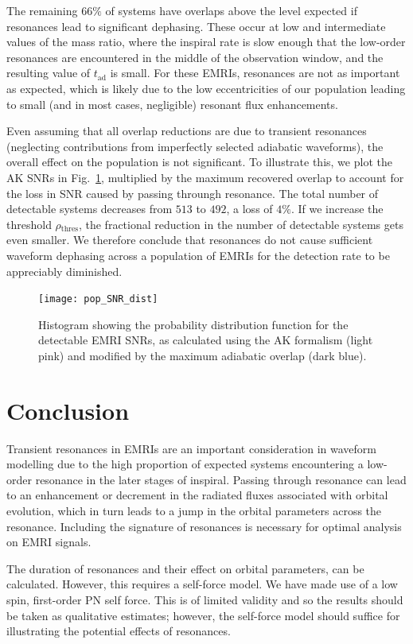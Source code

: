 \documentclass[aps,prd,amsfonts,amssymb,amsmath,nofootinbib,showpacs,superscriptaddress,twocolumn,floatfix]{revtex4-1}
\newcommand{\figref}[1]{Fig.~\ref{fig:#1}}
\newcommand{\sub}[1]{\ensuremath{_\mathrm{#1}}}
\begin{document}
The remaining $66\%$ of systems have overlaps above the level expected if resonances lead to significant dephasing. These occur at low and intermediate values of the mass ratio, where the inspiral rate is slow enough that the low-order resonances are encountered in the middle of the observation window, and the resulting value of $t\sub{ad}$ is small. For these EMRIs, resonances are not as important as expected, which is likely due to the low eccentricities of our population leading to small (and in most cases, negligible) resonant flux enhancements.

Even assuming that all overlap reductions are due to transient resonances (neglecting contributions from imperfectly selected adiabatic waveforms), the overall effect on the population is not significant. To illustrate this, we plot the AK SNRs in \figref{pop-SNR-dist}, multiplied by the maximum recovered overlap to account for the loss in SNR caused by passing throungh resonance. The total number of detectable systems decreases from $513$ to $492$, a loss of $4\%$. If we increase the threshold $\rho\sub{thres}$, the fractional reduction in the number of detectable systems gets even smaller. We therefore conclude that resonances do not cause sufficient waveform dephasing across a population of EMRIs for the detection rate to be appreciably diminished.

\begin{figure}
\centering
\texttt{[image: pop\_SNR\_dist]}
\caption{\label{fig:pop-SNR-dist}Histogram showing the probability distribution function for the detectable EMRI SNRs, as calculated using the AK formalism (light pink) and modified by the maximum adiabatic overlap (dark blue).}
\end{figure}

\section{Conclusion}
\label{sec:conclusion}

Transient resonances in EMRIs are an important consideration in waveform modelling due to the high proportion of expected systems encountering a low-order resonance in the later stages of inspiral. Passing through resonance can lead to an enhancement or decrement in the radiated fluxes associated with orbital evolution, which in turn leads to a jump in the orbital parameters across the resonance. Including the signature of resonances is necessary for optimal analysis on EMRI signals. 

The duration of resonances and their effect on orbital parameters, can be calculated. However, this requires a self-force model. We have made use of a low spin, first-order PN self force. This is of limited validity and so the results should be taken as qualitative estimates; however, the self-force model should suffice for illustrating the potential effects of resonances.
\end{document}
